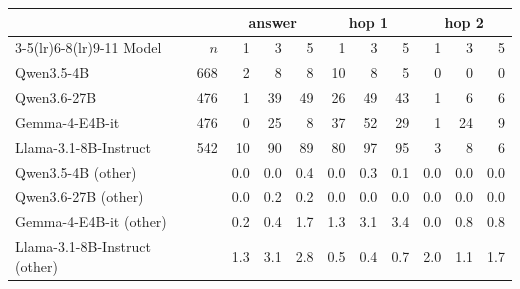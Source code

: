\begin{tabular}{lrrrrrrrrrr}
\toprule
 & & \multicolumn{3}{c}{answer} & \multicolumn{3}{c}{hop 1} & \multicolumn{3}{c}{hop 2} \\
\cmidrule(lr){3-5}\cmidrule(lr){6-8}\cmidrule(lr){9-11}
Model & $n$ & 1 & 3 & 5 & 1 & 3 & 5 & 1 & 3 & 5 \\
\midrule
Qwen3.5-4B & 668 & 2 & 8 & 8 & 10 & 8 & 5 & 0 & 0 & 0 \\
Qwen3.6-27B & 476 & 1 & 39 & 49 & 26 & 49 & 43 & 1 & 6 & 6 \\
Gemma-4-E4B-it & 476 & 0 & 25 & 8 & 37 & 52 & 29 & 1 & 24 & 9 \\
Llama-3.1-8B-Instruct & 542 & 10 & 90 & 89 & 80 & 97 & 95 & 3 & 8 & 6 \\
\midrule
Qwen3.5-4B (other) & & 0.0 & 0.0 & 0.4 & 0.0 & 0.3 & 0.1 & 0.0 & 0.0 & 0.0 \\
Qwen3.6-27B (other) & & 0.0 & 0.2 & 0.2 & 0.0 & 0.0 & 0.0 & 0.0 & 0.0 & 0.0 \\
Gemma-4-E4B-it (other) & & 0.2 & 0.4 & 1.7 & 1.3 & 3.1 & 3.4 & 0.0 & 0.8 & 0.8 \\
Llama-3.1-8B-Instruct (other) & & 1.3 & 3.1 & 2.8 & 0.5 & 0.4 & 0.7 & 2.0 & 1.1 & 1.7 \\
\bottomrule
\end{tabular}
